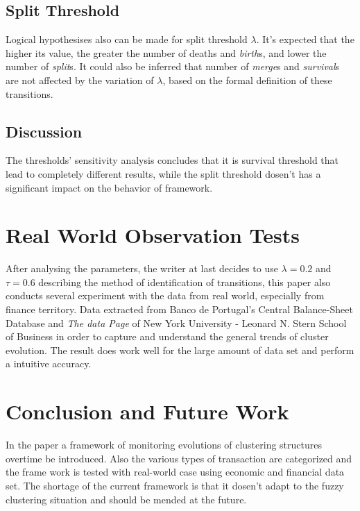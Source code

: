 \documentclass{sig-alternate-05-2015}
\begin{document}
\subsection{Split Threshold}
Logical hypothesises also can be made for split threshold $\lambda$. It's expected that the higher its value, the greater the number of deaths and \emph{birth}s, and lower the number of \emph{split}s. It could also be inferred that number of \emph{merge}s and \emph{survival}s are not affected by the variation of $\lambda$, based on the formal definition of these transitions.
\subsection{Discussion}
The thresholds' sensitivity analysis concludes that it is survival threshold that lead to completely different results, while the split threshold dosen't has a significant impact on the behavior of framework.

\section{Real World Observation Tests}
After analysing the parameters, the writer at last decides to use $\lambda=0.2$ and $\tau=0.6$ describing the method of identification of transitions, this paper also conducts several experiment with the data from real world, especially from finance territory. Data extracted from Banco de Portugal's Central Balance-Sheet Database and \emph{The data Page} of New York University - Leonard N. Stern School of Business in order to capture and understand the general trends of cluster evolution. The result does work well for the large amount of data set and perform a intuitive accuracy.

\section{Conclusion and Future Work}
In the paper a framework of monitoring evolutions of clustering structures overtime be introduced. Also the various types of transaction are categorized and the frame work is tested with real-world case using economic and financial data set. The shortage of the current framework is that it dosen't adapt to the fuzzy clustering situation and should be mended at the future.



\end{document}
